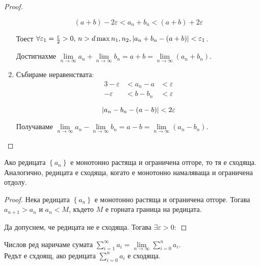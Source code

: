 \begin{theorem}
\begin{proof}
\begin{enumerate}
                  \[(a+b)-2\varepsilon < a_n + b_n < (a+b)+2\varepsilon\]

                  Тоест $\forall\varepsilon_1 = \frac{\varepsilon}{2} > 0,\, n > d\max{n_1,n_2}, \lvert a_n+b_n-(a+b)\rvert < \varepsilon_1$.

                  Достигнахме $\lim\limits_{n\to\infty}a_n+\lim\limits_{n\to\infty}b_n = a+b = \lim\limits_{n\to\infty}(a_n+b_n)$.

            \item Събираме неравенствата:
                  \begin{alignat*}{3}
                      -\varepsilon & < a_n - a & < \varepsilon \\
                      -\varepsilon & < b - b_n & < \varepsilon
                  \end{alignat*}

                  \[\lvert a_n - b_n - (a-b)\rvert < 2\varepsilon\]

                  Получаваме $\lim\limits_{n\to\infty}a_n-\lim\limits_{n\to\infty}b_n = a-b = \lim\limits_{n\to\infty}(a_n-b_n)$.

        \end{enumerate}
            \item {}
            \item {}
            \item {}
    \end{proof}
\end{theorem}

\begin{theorem}
    Ако редицата $\left\{a_n\right\}$ е монотонно растяща и ограничена отгоре, то тя е сходяща. \\
    Аналогично, редицата е сходяща, когато е монотонно намаляваща и ограничена отдолу.
    
    \begin{proof}
        Нека редицата $\left\{a_n\right\}$ е монотонно растяща и ограничена отгоре.
        Тогава $a_{n+1} > a_n$ и $a_n < M$, където $M$ е горната граница на редицата.

        Да допуснем, че редицата не е сходяща. Тогава $\exists \varepsilon > 0 : $
    \end{proof}
\end{theorem}

\begin{definition}
    Числов ред наричаме сумата $\sum\limits_{i=1}^\infty a_i = \lim\limits_{n\to\infty}\sum\limits_{i=0}^na_i$. \\
    Редът е схдоящ, ако редицата $\sum\limits_{i=0}^na_i$ е сходяща.
\end{definition}